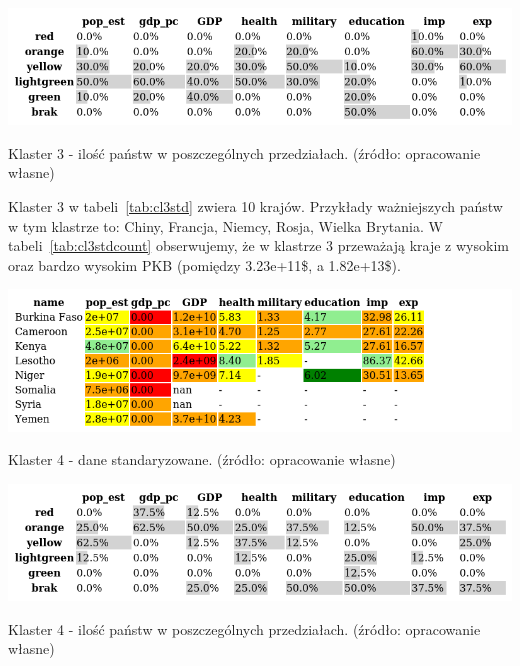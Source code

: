 \documentclass[11pt]{report}
\begin{document}
    \begin{table}[!htp]
        \centering
        \includegraphics[width=\linewidth]{tables/CLUST/cluster3stdkmeanscount.png}
        \caption{Klaster 3 - ilość państw w poszczególnych przedziałach. (źródło: opracowanie własne)}
        \label{tab:cl3stdcount}
    \end{table}

    Klaster 3 w tabeli~\ref{tab:cl3std} zwiera 10 krajów.
    Przykłady ważniejszych państw w tym klastrze to: Chiny, Francja, Niemcy, Rosja, Wielka Brytania.
    W tabeli~\ref{tab:cl3stdcount} obserwujemy, że w klastrze 3 przeważają kraje z wysokim oraz bardzo wysokim PKB (pomiędzy 3.23e+11\$, a 1.82e+13\$).

    \begin{table}[!htp]
        \centering
        \includegraphics[width=\linewidth]{tables/CLUST/cluster4stdkmeans.png}
        \caption{Klaster 4 - dane standaryzowane. (źródło: opracowanie własne)}
        \label{tab:cl4std}
    \end{table}

    \begin{table}[!htp]
        \centering
        \includegraphics[width=\linewidth]{tables/CLUST/cluster4stdkmeanscount.png}
        \caption{Klaster 4 - ilość państw w poszczególnych przedziałach. (źródło: opracowanie własne)}
        \label{tab:cl4stdcount}
    \end{table}
\end{document}
